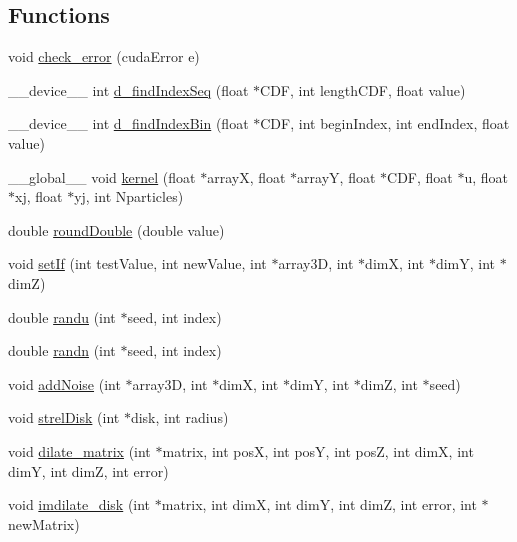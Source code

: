 \subsection*{Functions}
\begin{DoxyCompactItemize}
\item 
void \hyperlink{ex__particle__CUDA__naive__full_8cu_a4a894e10d3ce85515e41ac09c7f052c3}{check\_\-error} (cudaError e)
\item 
\_\-\_\-device\_\-\_\- int \hyperlink{ex__particle__CUDA__naive__full_8cu_ab34812b8ea6a39f94f261d2e64ae2f0f}{d\_\-findIndexSeq} (float $\ast$CDF, int lengthCDF, float value)
\item 
\_\-\_\-device\_\-\_\- int \hyperlink{ex__particle__CUDA__naive__full_8cu_a6ded92551e271ff186c6f08dbf3a8443}{d\_\-findIndexBin} (float $\ast$CDF, int beginIndex, int endIndex, float value)
\item 
\_\-\_\-global\_\-\_\- void \hyperlink{ex__particle__CUDA__naive__full_8cu_a13c2e7691b5ac6748868aa438850e0b1}{kernel} (float $\ast$arrayX, float $\ast$arrayY, float $\ast$CDF, float $\ast$u, float $\ast$xj, float $\ast$yj, int Nparticles)
\item 
double \hyperlink{ex__particle__CUDA__naive__full_8cu_a8b9e6dd1f65d08f3f2537574b12f7fe5}{roundDouble} (double value)
\item 
void \hyperlink{ex__particle__CUDA__naive__full_8cu_a0ee0664eb7123e026513e7cf19ba3434}{setIf} (int testValue, int newValue, int $\ast$array3D, int $\ast$dimX, int $\ast$dimY, int $\ast$dimZ)
\item 
double \hyperlink{ex__particle__CUDA__naive__full_8cu_ab1c72924f3fb8ede452cb4f287907741}{randu} (int $\ast$seed, int index)
\item 
double \hyperlink{ex__particle__CUDA__naive__full_8cu_a4b441b42d0a8b6dc3a2b30db3be1d6b5}{randn} (int $\ast$seed, int index)
\item 
void \hyperlink{ex__particle__CUDA__naive__full_8cu_ac771bf31b048f6a46077a3da36068a02}{addNoise} (int $\ast$array3D, int $\ast$dimX, int $\ast$dimY, int $\ast$dimZ, int $\ast$seed)
\item 
void \hyperlink{ex__particle__CUDA__naive__full_8cu_a2f03f766b1c044ea6bab007e1975a23f}{strelDisk} (int $\ast$disk, int radius)
\item 
void \hyperlink{ex__particle__CUDA__naive__full_8cu_af2a0216d5b584632a6508d5ad918734e}{dilate\_\-matrix} (int $\ast$matrix, int posX, int posY, int posZ, int dimX, int dimY, int dimZ, int error)
\item 
void \hyperlink{ex__particle__CUDA__naive__full_8cu_a707e839d9152f9bf820dee64c6627f5b}{imdilate\_\-disk} (int $\ast$matrix, int dimX, int dimY, int dimZ, int error, int $\ast$newMatrix)

\end{DoxyCompactItemize}

